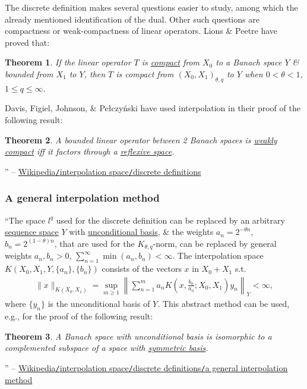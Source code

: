 \documentclass[oneside]{book}
\numberwithin{equation}{section}
\newtheorem{theorem}{Theorem}[chapter]
\begin{document}
The discrete definition makes several questions easier to study, among which the already mentioned identification of the dual. Other such questions are compactness or weak-compactness of linear operators. Lions \& Peetre have proved that:

\begin{theorem}
	If the linear operator $T$ is \href{https://en.wikipedia.org/wiki/Compact_operator}{compact} from $X_0$ to a Banach space $Y$ \& bounded from $X_1$ to $Y$, then $T$ is compact from $(X_0,X_1)_{\theta,q}$ to $Y$ when $0 < \theta < 1$, $1\le q\le\infty$.
\end{theorem}
Davis, Figiel, Johnson, \& Pe\l czy\'nski have used interpolation in their proof of the following result:

\begin{theorem}
	A bounded linear operator between 2 Banach spaces is \href{https://en.wikipedia.org/wiki/Weak_topology}{weakly compact} iff it factors through a \href{https://en.wikipedia.org/wiki/Reflexive_space}{reflexive space}.
\end{theorem}
\noindent'' -- \href{https://en.wikipedia.org/wiki/Interpolation_space#Discrete_definitions}{Wikipedia\texttt{/}interpolation space\texttt{/}discrete definitions}

\subsubsection{A general interpolation method}
``The space $l^q$ used for the discrete definition can be replaced by an arbitrary \href{https://en.wikipedia.org/wiki/Sequence_space}{sequence space} $Y$ with \href{https://en.wikipedia.org/wiki/Schauder_basis#Unconditionality}{unconditional basis}, \& the weights $a_n = 2^{-\theta n}$, $b_n = 2^{(1 - \theta)n}$, that are used for the $K_{\theta,q}$-norm, can be replaced by general weights $a_n,b_n > 0$, $\sum_{n=1}^\infty \min(a_n,b_n) < \infty$. The interpolation space $K(X_0,X_1,Y,\{a_n\},\{b_n\})$ consists of the vectors $x$ in $X_0 + X_1$ s.t.
\begin{align*}
	\|x\|_{K(X_0,X_1)} = \sup_{m\ge 1} \left\|\sum_{n=1}^m a_nK\left(x,\frac{b_n}{a_n};X_0,X_1\right)y_n\right\|_Y < \infty,
\end{align*}
where $\{y_n\}$ is the unconditional basis of $Y$. This abstract method can be used, e.g., for the proof of the following result:

\begin{theorem}
	A Banach space with unconditional basis is isomorphic to a complemented subspace of a space with \href{https://en.wikipedia.org/wiki/Schauder_basis#Unconditionality}{symmetric basis}.
\end{theorem}
\noindent'' -- \href{https://en.wikipedia.org/wiki/Interpolation_space#A_general_interpolation_method}{Wikipedia\texttt{/}interpolation space\texttt{/}discrete definitions\texttt{/}a general interpolation method}
\end{document}
